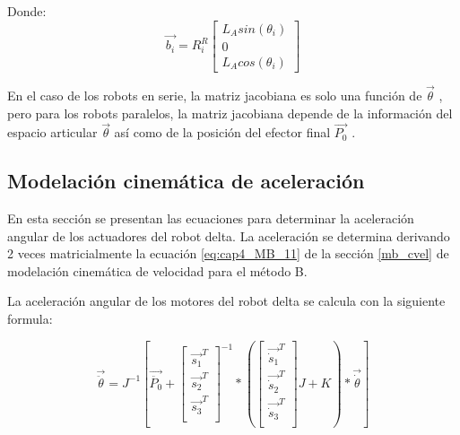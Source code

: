     Donde:
    \begin{equation}
        \overrightarrow{b_{i}} = R_{i}^{R}             
        \begin{bmatrix}
                L_{A} sin(\theta_i) \\
                0\\
                L_{A} cos(\theta_i) 
            \end{bmatrix}
        \label{eq:cap4_MB_15}
    \end{equation}  
    
    En el caso de los robots en serie, la matriz jacobiana es solo una función de $\overrightarrow{\theta}$   , pero para los robots paralelos, la matriz jacobiana depende de la información del espacio articular $\overrightarrow{\theta}$   así como de la posición del efector final $\overrightarrow{P_0}$   .
        \newpage

    \subsection{Modelación cinemática de aceleración}\label{cap4_mb_subsection_acel}
        
        En esta sección se presentan las ecuaciones para determinar la aceleración angular de los actuadores del robot delta. La aceleración se determina derivando 2 veces matricialmente la ecuación \ref{eq:cap4_MB_11} de la sección \ref{mb_cvel} de modelación cinemática de velocidad para el método B.
        
        La aceleración angular de los motores del robot delta se calcula con la siguiente formula:
        
        
        \begin{equation}
                    \overrightarrow{\ddot{ \theta }}=J^{-1} \left[ \overrightarrow{\ddot{P_{0}}}+ \left[ \begin{matrix}
                \overrightarrow{s_{1}}^{T}\\
                \overrightarrow{s_{2}}^{T}\\
                \overrightarrow{s_{3}}^{T}\\
                \end{matrix}
                 \right] ^{-1} \ast \left(  \left[ \begin{matrix}
                \overrightarrow{\dot{s}_{1}}^{T}\\
                \overrightarrow{\dot{s}_{2}}^{T}\\
                \overrightarrow{\dot{s}_{3}}^{T}\\
                \end{matrix}
                 \right]  J+K \right) \ast\overrightarrow{\dot{ \theta }} \right]
            \label{eq:cap4_MB_16}
        \end{equation} 

